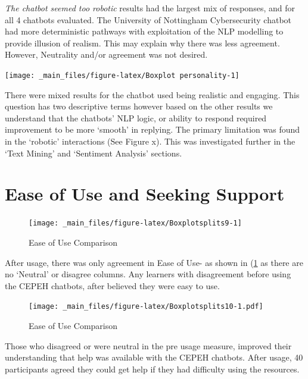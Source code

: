 \documentclass[a4paper, nobind]{templates/ociamthesis}
\begin{document}
\emph{The chatbot seemed too robotic} results had the largest mix of
responses, and for all 4 chatbots evaluated. The University of
Nottingham Cybersecurity chatbot had more deterministic pathways with
exploitation of the NLP modelling to provide illusion of realism. This
may explain why there was less agreement. However, Neutrality and/or
agreement was not desired.

\begin{center}\texttt{[image: \_main\_files/figure-latex/Boxplot personality-1]} \end{center}

There were mixed results for the chatbot used being realistic and engaging. This question has two descriptive terms however based on the other results we understand that the chatbots' NLP logic, or ability to respond required improvement to be more `smooth' in replying. The primary limitation was found in the `robotic' interactions (See Figure x). This was
investigated further in the `Text Mining' and `Sentiment Analysis' sections.

\hypertarget{ease-of-use-and-seeking-support}{%
\section{Ease of Use and Seeking Support}\label{ease-of-use-and-seeking-support}}

\begin{figure}

{\centering \texttt{[image: \_main\_files/figure-latex/Boxplotsplits9-1]} 

}

\caption{Ease of Use Comparison}\label{fig:Boxplotsplits9}
\end{figure}

After usage, there was only agreement in Ease of Use- as shown in
(\ref{fig:Boxplotsplits9} as there are no `Neutral' or disagree
columns. Any learners with disagreement before using the CEPEH chatbots,
after believed they were easy to use.

\begin{figure}
\centering
\texttt{[image: \_main\_files/figure-latex/Boxplotsplits10-1.pdf]}
\caption{\label{fig:Boxplotsplits10}Ease of Use Comparison}
\end{figure}

Those who disagreed or were neutral in the pre usage measure, improved
their understanding that help was available with the CEPEH chatbots.
After usage, 40 participants agreed they could get help if they had
difficulty using the resources.
\end{document}
